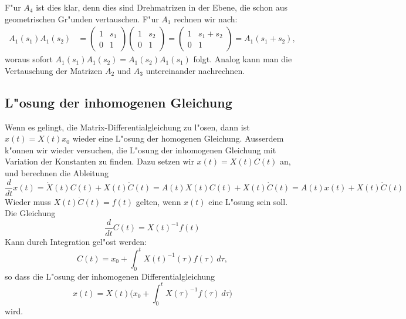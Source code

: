 F"ur $A_4$ ist dies klar, denn dies sind Drehmatrizen in der Ebene,
die schon aus geometrischen Gr"unden vertauschen.
F"ur $A_1$ rechnen wir nach:
\begin{align*}
A_1(s_1)A_1(s_2)
&=
\begin{pmatrix}1&s_1\\0&1\end{pmatrix}
\begin{pmatrix}1&s_2\\0&1\end{pmatrix}
=
\begin{pmatrix}1&s_1+s_2\\0&1\end{pmatrix}
=
A_1(s_1+s_2),
\end{align*}
woraus sofort
$
A_1(s_1)A_1(s_2)=
A_1(s_2)A_1(s_1)
$
folgt.
Analog kann man die Vertauschung der Matrizen $A_2$ und $A_3$ untereinander
nachrechnen.

\subsection{L"osung der inhomogenen Gleichung}
Wenn es gelingt, die Matrix-Differentialgleichung zu l"osen, dann
ist $x(t)=X(t)x_0$ wieder eine L"osung der homogenen Gleichung.
Ausserdem k"onnen wir wieder versuchen, die L"osung der inhomogenen
Gleichung mit Variation der Konstanten zu finden.
Dazu setzen wir $x(t)=X(t)C(t)$ an, und berechnen die Ableitung
\[
\frac{d}{dt}x(t)
=
\dot{X}(t)C(t)+X(t)\dot{C}(t)
=
A(t)X(t)C(t)+X(t)\dot{C}(t)
=
A(t)x(t)+X(t)\dot{C}(t)
\]
Wieder muss $X(t)\dot{C}(t)=f(t)$ gelten, wenn $x(t)$ eine L"osung sein
soll.
Die Gleichung
\[
\frac{d}{dt}C(t)
=
X(t)^{-1}f(t)
\]
Kann durch Integration gel"ost werden:
\[
C(t)
=x_0+\int_0^t X(t)^{-1}(\tau)f(\tau)\,d\tau,
\]
so dass die L"osung der inhomogenen Differentialgleichung
\[
x(t)=X(t)\biggl(x_0+\int_0^t X(\tau)^{-1} f(\tau)\,d\tau\biggr)
\]
wird.